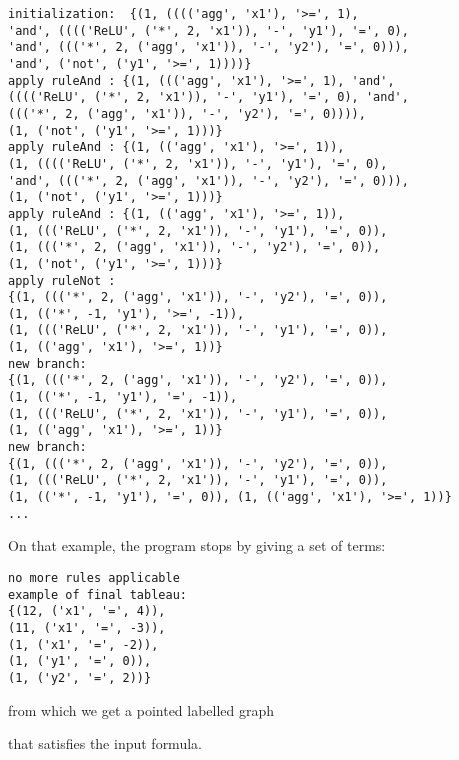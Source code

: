 \begin{scriptsize}
\begin{verbatim}
initialization:  {(1, (((('agg', 'x1'), '>=', 1), 
'and', (((('ReLU', ('*', 2, 'x1')), '-', 'y1'), '=', 0),
'and', ((('*', 2, ('agg', 'x1')), '-', 'y2'), '=', 0))),
'and', ('not', ('y1', '>=', 1))))}
apply ruleAnd : {(1, ((('agg', 'x1'), '>=', 1), 'and', 
(((('ReLU', ('*', 2, 'x1')), '-', 'y1'), '=', 0), 'and',
((('*', 2, ('agg', 'x1')), '-', 'y2'), '=', 0)))),
(1, ('not', ('y1', '>=', 1)))}
apply ruleAnd : {(1, (('agg', 'x1'), '>=', 1)),
(1, (((('ReLU', ('*', 2, 'x1')), '-', 'y1'), '=', 0), 
'and', ((('*', 2, ('agg', 'x1')), '-', 'y2'), '=', 0))),
(1, ('not', ('y1', '>=', 1)))}
apply ruleAnd : {(1, (('agg', 'x1'), '>=', 1)),
(1, ((('ReLU', ('*', 2, 'x1')), '-', 'y1'), '=', 0)),
(1, ((('*', 2, ('agg', 'x1')), '-', 'y2'), '=', 0)),
(1, ('not', ('y1', '>=', 1)))}
apply ruleNot : 
{(1, ((('*', 2, ('agg', 'x1')), '-', 'y2'), '=', 0)), 
(1, (('*', -1, 'y1'), '>=', -1)),
(1, ((('ReLU', ('*', 2, 'x1')), '-', 'y1'), '=', 0)),
(1, (('agg', 'x1'), '>=', 1))}
new branch:
{(1, ((('*', 2, ('agg', 'x1')), '-', 'y2'), '=', 0)),
(1, (('*', -1, 'y1'), '=', -1)), 
(1, ((('ReLU', ('*', 2, 'x1')), '-', 'y1'), '=', 0)), 
(1, (('agg', 'x1'), '>=', 1))}
new branch:  
{(1, ((('*', 2, ('agg', 'x1')), '-', 'y2'), '=', 0)),
(1, ((('ReLU', ('*', 2, 'x1')), '-', 'y1'), '=', 0)),
(1, (('*', -1, 'y1'), '=', 0)), (1, (('agg', 'x1'), '>=', 1))}
...
\end{verbatim}
\end{scriptsize}


On that example, the program stops by giving a set of terms:

\begin{scriptsize}
\begin{verbatim}
no more rules applicable
example of final tableau: 
{(12, ('x1', '=', 4)),
(11, ('x1', '=', -3)),
(1, ('x1', '=', -2)),
(1, ('y1', '=', 0)),
(1, ('y2', '=', 2))}
\end{verbatim}
\end{scriptsize}
from which we get a pointed labelled graph
\begin{center}
\end{center}
that satisfies the input formula.

